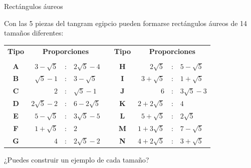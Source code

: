 \documentclass[14pt,aspectratio=169,usenames,dvipsnames]{beamer}
\begin{document}
    \begin{frame}{Rectángulos áureos}
        \begin{center}
            Con las 5 piezas del tangram egipcio pueden formarse rectángulos áureos de 14 tamaños diferentes:

            \bigskip\bigskip

            {\small\begin{tabular}{c|rclcc|rcl}
                \textbf{Tipo} & \multicolumn{3}{c}{\textbf{Proporciones}} & \qquad & \textbf{Tipo} & \multicolumn{3}{c}{\textbf{Proporciones}} \\[0.5ex]\cline{1-4}\cline{6-9}&&&&&&&&\\[-1.5ex]
                \textbf{A} & $3\!-\!\sqrt{5}$  &\!\!\!\!:\!\!\!\!& $2\sqrt{5}\!-\!4$ & & \textbf{H} & $2\sqrt{5}$       &\!\!\!\!:\!\!\!\!& $5\!-\!\sqrt{5}$  \\
                \textbf{B} & $\sqrt{5}\!-\!1$  &\!\!\!\!:\!\!\!\!& $3\!-\!\sqrt{5}$  & & \textbf{I} & $3\!+\!\sqrt{5}$  &\!\!\!\!:\!\!\!\!& $1\!+\!\sqrt{5}$  \\
                \textbf{C} & $2$               &\!\!\!\!:\!\!\!\!& $\sqrt{5}\!-\!1$  & & \textbf{J} & $6$               &\!\!\!\!:\!\!\!\!& $3\sqrt{5}\!-\!3$ \\
                \textbf{D} & $2\sqrt{5}\!-\!2$ &\!\!\!\!:\!\!\!\!& $6\!-\!2\sqrt{5}$ & & \textbf{K} & $2\!+\!2\sqrt{5}$ &\!\!\!\!:\!\!\!\!& $4$               \\
                \textbf{E} & $5\!-\!\sqrt{5}$  &\!\!\!\!:\!\!\!\!& $3\sqrt{5}\!-\!5$ & & \textbf{L} & $5\!+\!\sqrt{5}$  &\!\!\!\!:\!\!\!\!& $2\sqrt{5}$       \\
                \textbf{F} & $1\!+\!\sqrt{5}$  &\!\!\!\!:\!\!\!\!& $2$               & & \textbf{M} & $1\!+\!3\sqrt{5}$ &\!\!\!\!:\!\!\!\!& $7\!-\!\sqrt{5}$  \\
                \textbf{G} & $4$               &\!\!\!\!:\!\!\!\!& $2\sqrt{5}\!-\!2$ & & \textbf{N} & $4\!+\!2\sqrt{5}$ &\!\!\!\!:\!\!\!\!& $3\!+\!\sqrt{5}$  \\
            \end{tabular}}

            \bigskip\bigskip

            ¿Puedes construir un ejemplo de cada tamaño?
        \end{center}
    \end{frame}

\end{document}
